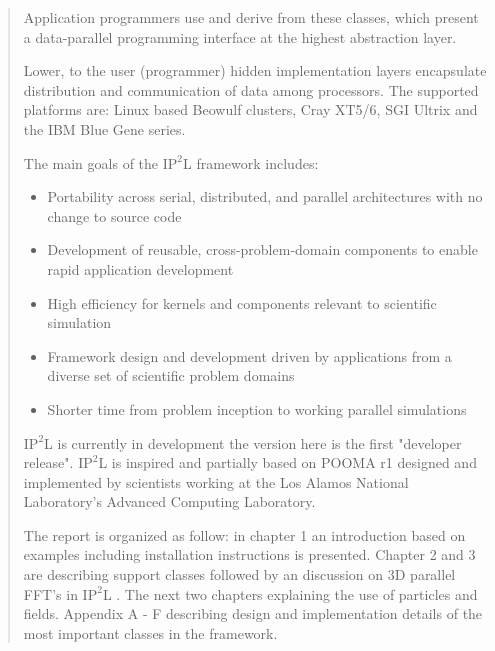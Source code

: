 \documentclass[12pt,a4paper]{report}
\newcommand{\ippl}{\textsc{I$\text{P}^2$L }}
\begin{document}
\begin{titlepage}
\begin{quotation}
Application programmers use and derive from these classes, which present a data-parallel programming interface at the highest abstraction layer.

Lower, to the user (programmer) hidden implementation layers encapsulate distribution and communication of data among processors. The supported platforms are: Linux based Beowulf clusters, Cray XT5/6, SGI Ultrix and the IBM Blue Gene series.

The main goals of the \ippl  framework includes:
\begin{itemize}
    \item Portability across serial, distributed, and parallel architectures with no change to source code
    \item Development of reusable, cross-problem-domain components to enable rapid application development
    \item High efficiency for kernels and components relevant to scientific simulation
    \item Framework design and development driven by applications from a diverse set of scientific problem domains
    \item Shorter time from problem inception to working parallel simulations 
\end{itemize}
 \ippl is currently in development the version here is the first "developer release". \ippl is inspired and partially based on POOMA r1 designed and implemented by scientists working at the Los Alamos National Laboratory's Advanced Computing Laboratory. 

The report is organized as follow: in chapter 1 an introduction based on examples including installation instructions is presented. Chapter 2 and 3 are describing support classes followed by an discussion
on 3D parallel FFT's in \ippl. The next two chapters explaining the use of particles and fields. Appendix A - F describing design and implementation details of the most important classes in the
framework.
\end{quotation}
\vfill


\end{titlepage}

\tableofcontents
\listoftables
\listoffigures






\appendix







\printindex
\end{document}
